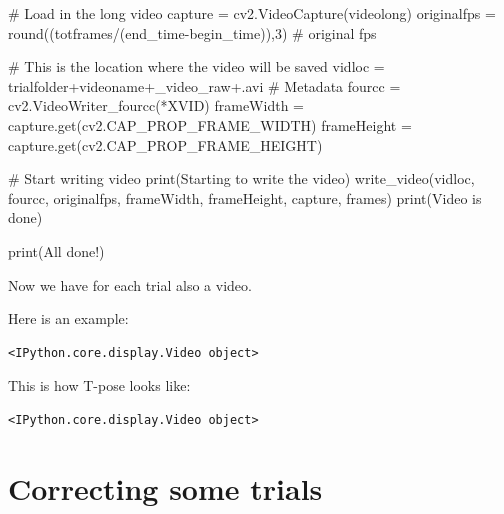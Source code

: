 \documentclass[
  letterpaper,
  DIV=11,
  numbers=noendperiod]{scrreprt}
\newenvironment{Shaded}{\begin{snugshade}}{\end{snugshade}}
\newcommand{\BuiltInTok}[1]{\textcolor[rgb]{0.00,0.23,0.31}{#1}}
\newcommand{\CommentTok}[1]{\textcolor[rgb]{0.37,0.37,0.37}{#1}}
\newcommand{\DecValTok}[1]{\textcolor[rgb]{0.68,0.00,0.00}{#1}}
\newcommand{\NormalTok}[1]{\textcolor[rgb]{0.00,0.23,0.31}{#1}}
\newcommand{\OperatorTok}[1]{\textcolor[rgb]{0.37,0.37,0.37}{#1}}
\newcommand{\StringTok}[1]{\textcolor[rgb]{0.13,0.47,0.30}{#1}}
\begin{document}
\begin{Shaded}
\begin{Highlighting}[]
        \CommentTok{\# Load in the long video}
\NormalTok{        capture }\OperatorTok{=}\NormalTok{ cv2.VideoCapture(videolong) }
\NormalTok{        originalfps }\OperatorTok{=} \BuiltInTok{round}\NormalTok{((totframes}\OperatorTok{/}\NormalTok{(end\_time}\OperatorTok{{-}}\NormalTok{begin\_time)),}\DecValTok{3}\NormalTok{) }\CommentTok{\# original fps}
        
        \CommentTok{\# This is the location where the video will be saved}
\NormalTok{        vidloc }\OperatorTok{=}\NormalTok{ trialfolder}\OperatorTok{+}\NormalTok{videoname}\OperatorTok{+}\StringTok{\textquotesingle{}\_video\_raw\textquotesingle{}}\OperatorTok{+}\StringTok{\textquotesingle{}.avi\textquotesingle{}}
        \CommentTok{\# Metadata}
\NormalTok{        fourcc }\OperatorTok{=}\NormalTok{ cv2.VideoWriter\_fourcc(}\OperatorTok{*}\StringTok{\textquotesingle{}XVID\textquotesingle{}}\NormalTok{)}
\NormalTok{        frameWidth }\OperatorTok{=}\NormalTok{ capture.get(cv2.CAP\_PROP\_FRAME\_WIDTH)}
\NormalTok{        frameHeight }\OperatorTok{=}\NormalTok{ capture.get(cv2.CAP\_PROP\_FRAME\_HEIGHT)}

        \CommentTok{\# Start writing video}
        \BuiltInTok{print}\NormalTok{(}\StringTok{\textquotesingle{}Starting to write the video\textquotesingle{}}\NormalTok{)}
\NormalTok{        write\_video(vidloc, fourcc, originalfps, frameWidth, frameHeight, capture, frames)}
        \BuiltInTok{print}\NormalTok{(}\StringTok{\textquotesingle{}Video is done\textquotesingle{}}\NormalTok{)}

\BuiltInTok{print}\NormalTok{(}\StringTok{\textquotesingle{}All done!\textquotesingle{}}\NormalTok{)}
\end{Highlighting}
\end{Shaded}

Now we have for each trial also a video.

Here is an example:

\begin{verbatim}
<IPython.core.display.Video object>
\end{verbatim}

This is how T-pose looks like:

\begin{verbatim}
<IPython.core.display.Video object>
\end{verbatim}


\chapter{Correcting some trials}\label{correcting-some-trials}
\end{document}
